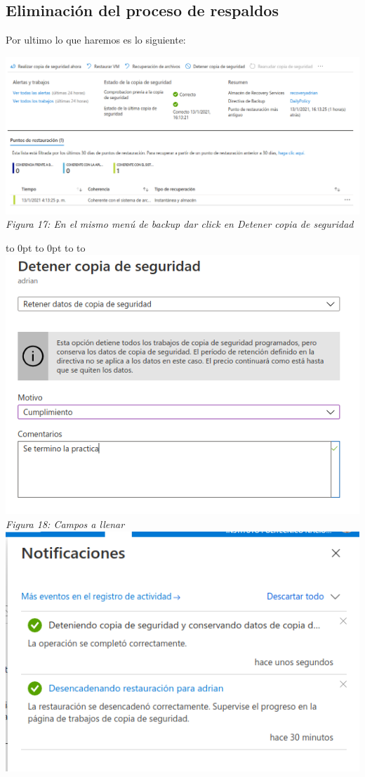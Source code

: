 \documentclass[10pt,executivepaper]{article}
\def\fillandplacepagenumber{%
 \par\pagestyle{empty}%
 \vbox to 0pt{\vss}\vfill
 \vbox to 0pt{\baselineskip0pt
   \hbox to\linewidth{\hss}%
   \baselineskip\footskip
   \hbox to\linewidth{%
     \hfil\thepage\hfil}\vss}}
\begin{document}
\begin{landscape}
  \subsection{Eliminación del proceso de respaldos}
  Por ultimo lo que haremos es lo siguiente:
  \begin{center}
    \includegraphics[scale=0.5]{imgs/15.png}\\
    \textit{Figura 17: En el mismo menú de backup dar click en Detener copia de seguridad}\\
    \fillandplacepagenumber
    \includegraphics[scale=0.45]{imgs/16.png}\\
    \textit{Figura 18: Campos a llenar}\\
    \includegraphics[scale=0.45]{imgs/17.png}\\

\end{center}
\end{landscape}
\end{document}

